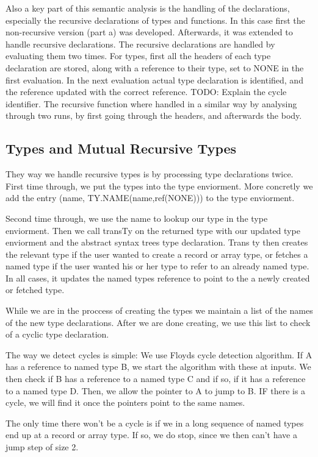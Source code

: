 \documentclass{article}
\begin{document}
Also a key part of this semantic analysis is the handling of the declarations, especially the recursive declarations of types and functions. In this case first the non-recursive version (part a) was developed. Afterwards, it was extended to handle recursive declarations. The recursive declarations are handled by evaluating them two times. For types, first all the headers of each type declaration are stored, along with a reference to their type, set to NONE in the first evaluation. In the next evaluation actual type declaration is identified, and the reference updated with the correct reference. TODO: Explain the cycle identifier. The recursive function where handled in a similar way by analysing through two runs, by first going through the headers, and afterwards the body.  

\subsection{Types and Mutual Recursive Types}
They way we handle recursive types is by processing type declarations twice. 
First time through, we put the types into the type enviorment. More concretly
we add the entry (name, TY.NAME(name,ref(NONE))) to the type enviorment.

Second time through, we use the name to lookup our type in the type enviorment.
Then we call transTy on the returned type with our updated type enviorment and the abstract syntax trees type declaration.
Trans ty then creates the relevant type if the user wanted to create a record or array type, or fetches a named type if the user wanted his or her type
to refer to an already named type. In all cases, it updates the named types reference to point to the a newly created or fetched type.

While we are in the proccess of creating the types we maintain a list of the names of the new type declarations. After
we are done creating, we use this list to check of a cyclic type declaration.

The way we detect cycles is simple: We use Floyds cycle detection algorithm. If A has a reference to named type B, we start the algorithm
with these at inputs. We then check if B has a reference to a named type C and if so, if it has a reference to a named type D. 
Then, we allow the pointer to A to jump to B. IF there is a cycle, we will find it once the pointers point to the same names.


The only time there won't be a cycle is if we in a long sequence of named types end up at a record or array type. If so, we do stop, since we then can't have a jump
step of size 2.
\end{document}
